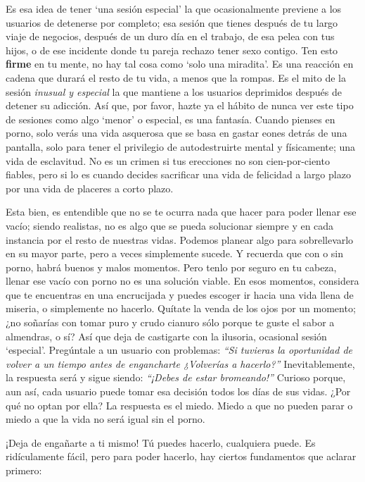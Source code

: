 \documentclass[
  spanish,
  openany]{book}
\begin{document}
Es esa idea de tener `una sesión especial' la que ocasionalmente previene a los usuarios de detenerse por completo; esa sesión que tienes después de tu largo viaje de negocios, después de un duro día en el trabajo, de esa pelea con tus hijos, o de ese incidente donde tu pareja rechazo tener sexo contigo. Ten esto \textbf{firme} en tu mente, no hay tal cosa como `solo una miradita'. Es una reacción en cadena que durará el resto de tu vida, a menos que la rompas. Es el mito de la sesión \emph{inusual y especial} la que mantiene a los usuarios deprimidos después de detener su adicción. Así que, por favor, hazte ya el hábito de nunca ver este tipo de sesiones como algo `menor' o especial, es una fantasía. Cuando pienses en porno, solo verás una vida asquerosa que se basa en gastar eones detrás de una pantalla, solo para tener el privilegio de autodestruirte mental y físicamente; una vida de esclavitud. No es un crimen si tus erecciones no son cien-por-ciento fiables, pero si lo es cuando decides sacrificar una vida de felicidad a largo plazo por una vida de placeres a corto plazo.

Esta bien, es entendible que no se te ocurra nada que hacer para poder llenar ese vacío; siendo realistas, no es algo que se pueda solucionar siempre y en cada instancia por el resto de nuestras vidas. Podemos planear algo para sobrellevarlo en su mayor parte, pero a veces simplemente sucede. Y recuerda que con o sin porno, habrá buenos y malos momentos. Pero tenlo por seguro en tu cabeza, llenar ese vacío con porno no es una solución viable. En esos momentos, considera que te encuentras en una encrucijada y puedes escoger ir hacia una vida llena de miseria, o simplemente no hacerlo. Quítate la venda de los ojos por un momento; ¿no soñarías con tomar puro y crudo cianuro sólo porque te guste el sabor a almendras, o sí? Así que deja de castigarte con la ilusoria, ocasional sesión `especial'. Pregúntale a un usuario con problemas: \emph{``Si tuvieras la oportunidad de volver a un tiempo antes de engancharte ¿Volverías a hacerlo?''} Inevitablemente, la respuesta será y sigue siendo: \emph{``¡Debes de estar bromeando!''} Curioso porque, aun así, cada usuario puede tomar esa decisión todos los días de sus vidas. ¿Por qué no optan por ella? La respuesta es el miedo. Miedo a que no pueden parar o miedo a que la vida no será igual sin el porno.

¡Deja de engañarte a ti mismo! Tú puedes hacerlo, cualquiera puede. Es ridículamente fácil, pero para poder hacerlo, hay ciertos fundamentos que aclarar primero:
\end{document}
